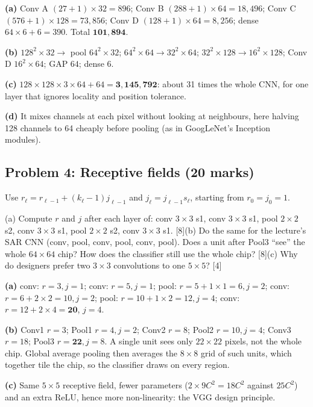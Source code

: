 \documentclass[11pt]{article}
\begin{document}
\begin{soln}\textbf{(a)} Conv A $(27+1)\times32=896$; Conv B $(288+1)\times64=18{,}496$; Conv C $(576+1)\times128=73{,}856$; Conv D $(128+1)\times64=8{,}256$; dense $64\times6+6=390$. Total $\mathbf{101{,}894}$.

\textbf{(b)} $128^2\times32\to$ pool $64^2\times32$; $64^2\times64\to32^2\times64$; $32^2\times128\to16^2\times128$; Conv D $16^2\times64$; GAP $64$; dense $6$.

\textbf{(c)} $128\times128\times3\times64+64=\mathbf{3{,}145{,}792}$: about 31 times the whole CNN, for one layer that ignores locality and position tolerance.

\textbf{(d)} It mixes channels at each pixel without looking at neighbours, here halving 128 channels to 64 cheaply before pooling (as in GoogLeNet's Inception modules).\end{soln}

\subsection{Problem 4: Receptive fields \normalfont\small\color{GreyN}(20 marks)}

\begin{prob}Use $r_\ell=r_{\ell-1}+(k_\ell-1)j_{\ell-1}$ and $j_\ell=j_{\ell-1}s_\ell$, starting from $r_0=j_0=1$.

(a) Compute $r$ and $j$ after each layer of: conv $3\times3$ s1, conv $3\times3$ s1, pool $2\times2$ s2, conv $3\times3$ s1, pool $2\times2$ s2, conv $3\times3$ s1. [8]\newline (b) Do the same for the lecture's SAR CNN (conv, pool, conv, pool, conv, pool). Does a unit after Pool3 ``see'' the whole $64\times64$ chip? How does the classifier still use the whole chip? [8]\newline (c) Why do designers prefer two $3\times3$ convolutions to one $5\times5$? [4]\end{prob}

\begin{soln}\textbf{(a)} conv: $r=3,j=1$; conv: $r=5,j=1$; pool: $r=5+1\times1=6,j=2$; conv: $r=6+2\times2=10,j=2$; pool: $r=10+1\times2=12,j=4$; conv: $r=12+2\times4=\mathbf{20}$, $j=4$.

\textbf{(b)} Conv1 $r=3$; Pool1 $r=4,j=2$; Conv2 $r=8$; Pool2 $r=10,j=4$; Conv3 $r=18$; Pool3 $r=\mathbf{22},j=8$. A single unit sees only $22\times22$ pixels, not the whole chip. Global average pooling then averages the $8\times8$ grid of such units, which together tile the chip, so the classifier draws on every region.

\textbf{(c)} Same $5\times5$ receptive field, fewer parameters ($2\times9C^2=18C^2$ against $25C^2$) and an extra ReLU, hence more non-linearity: the VGG design principle.\end{soln}
\end{document}
